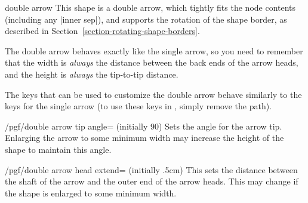 \begin{shape}{double arrow}
  This shape is a double arrow, which tightly fits the node contents
	(including any |inner sep|), and supports the rotation of the shape
	 border, as described in Section~\ref{section-rotating-shape-borders}.
	
	
\begin{codeexample}[]
\end{codeexample}

  The double arrow behaves exactly like the single arrow, so you
  need to remember that the width is \emph{always} the distance
  between the back ends of the arrow heads, and the height
  is \emph{always} the tip-to-tip distance.

\begin{codeexample}[]
\end{codeexample}

  The \pgfname{} keys that can be used to customize the double arrow
  behave similarly to the keys for the single arrow (to
	use these keys in \tikzname{}, simply remove the 
	path).

\begin{key}{/pgf/double arrow tip angle= (initially 90)}
  Sets the angle for the arrow tip. Enlarging the arrow to some
  minimum width may increase the height of the shape to maintain
  this angle.
\end{key}

\begin{key}{/pgf/double arrow head extend= (initially .5cm)}
  This sets the distance between the shaft of the arrow and the outer
  end of the arrow heads. This may change if the shape is enlarged to
  some minimum width.
\end{key}


\end{shape}
